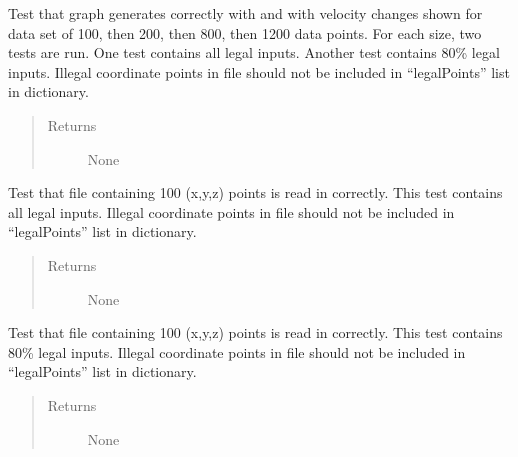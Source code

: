 \documentclass[letterpaper,10pt,english]{sphinxmanual}
\begin{document}
\begin{fulllineitems}
\begin{fulllineitems}
\label{\detokenize{index:src.Tests.Graph_Test.Graph_Test.test_graphShows_noError}}
Test that graph generates correctly with and with velocity changes shown
for data set of 100, then 200, then 800, then 1200 data points.
For each size, two tests are run. One test contains all legal inputs. Another test contains 80\% legal inputs.
Illegal coordinate points in file should not be included in “legalPoints” list in dictionary.
\begin{quote}\begin{description}
\item[{Returns}] \leavevmode
None

\end{description}\end{quote}

\end{fulllineitems}


\begin{fulllineitems}
\label{\detokenize{index:src.Tests.Graph_Test.Graph_Test.test_readCoordinates_size100_allLegal}}
Test that file containing 100 (x,y,z) points is read in correctly.
This test contains all legal inputs.
Illegal coordinate points in file should not be included in “legalPoints” list in dictionary.
\begin{quote}\begin{description}
\item[{Returns}] \leavevmode
None

\end{description}\end{quote}

\end{fulllineitems}


\begin{fulllineitems}
\label{\detokenize{index:src.Tests.Graph_Test.Graph_Test.test_readCoordinates_size100_someLegal}}
Test that file containing 100 (x,y,z) points is read in correctly.
This test contains 80\% legal inputs.
Illegal coordinate points in file should not be included in “legalPoints” list in dictionary.
\begin{quote}\begin{description}
\item[{Returns}] \leavevmode
None


\end{description}
\end{quote}
\end{fulllineitems}
\end{fulllineitems}
\end{document}
